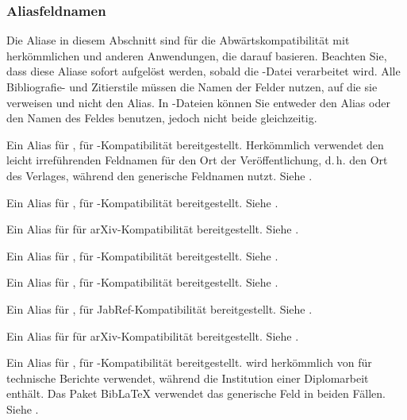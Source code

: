 \documentclass{ltxdockit}[2011/03/25]
\newcommand*{\biblatex}{BibLaTeX\xspace}
\begin{document}
\subsubsection{Aliasfeldnamen} \label{bib:fld:als}

Die Aliase in diesem Abschnitt sind für die Abwärtskompatibilität mit
herkömmlichen \bibtex und anderen Anwendungen, die darauf basieren. Beachten
Sie, dass diese Aliase sofort aufgelöst werden, sobald die -Datei
verarbeitet wird. Alle Bibliografie- und Zitierstile müssen die Namen der
Felder nutzen, auf die sie verweisen und nicht den Alias. In -Dateien
können Sie entweder den Alias oder den Namen des Feldes benutzen, jedoch nicht
beide gleichzeitig.

\begin{fieldlist}


Ein Alias für , für  \bibtex-Kompatibilität bereitgestellt.
Herkömmlich verwendet  \bibtex den leicht irreführenden Feldnamen
 für den Ort der Veröffentlichung, d.\,h. den Ort des
Verlages, während  den generische Feldnamen 
nutzt. Siehe .


Ein Alias für , für -Kompatibilität
bereitgestellt. Siehe .


Ein Alias für  für arXiv-Kompatibilität bereitgestellt.
Siehe . 


Ein Alias für , für \bibtex-Kompatibilität
bereitgestellt. Siehe .


Ein Alias für , für \bibtex-Kompatibilität bereitgestellt.
Siehe .


Ein Alias für , für JabRef-Kompatibilität bereitgestellt. Siehe
.


Ein Alias für  für arXiv-Kompatibilität bereitgestellt.
Siehe . 


Ein Alias für , für \bibtex-Kompatibilität bereitgestellt.
 wird herkömmlich von \bibtex für technische Berichte
verwendet, während  die Institution einer Diplomarbeit enthält.
Das Paket \biblatex verwendet das generische Feld  in
beiden Fällen. Siehe .

\end{fieldlist}
\end{document}
